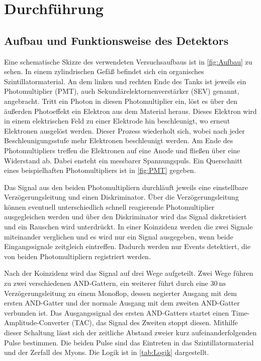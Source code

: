 \section{Durchführung}
\label{sec:Durchführung}
\subsection{Aufbau und Funktionsweise des Detektors}
\label{subsec:Aufbau}
Eine schematische Skizze des verwendeten Versuchsaufbaus ist in \autoref{fig:Aufbau} zu sehen. In einem zylindrischen Gefäß befindet sich ein organisches
Szintillatormaterial. An dem linken und rechten Ende des Tanks ist jeweils ein Photomultiplier (PMT), auch Sekundärelektornenverstärker (SEV) genannt, angebracht.
Tritt ein Photon in diesen Photomultiplier ein, löst es über den äußerden Photoeffekt ein Elektron aus dem Material heraus. Dieses Elektron wird in einem elektrischen Feld 
zu einer Elektrode hin beschleunigt, wo erneut Elektronen ausgelöst werden. Dieser Prozess wiederholt sich, wobei nach jeder Beschleunigungsstufe mehr Elektronen beschleunigt werden.
Am Ende des Photomultipliers treffen die Elektronen auf eine Anode und fließen über eine Widerstand ab. Dabei ensteht ein messbarer Spannungspuls. Ein Querschnitt eines beispielhaften
Photomultipliers ist in \autoref{fig:PMT} gegeben.

Das Signal aus den beiden Photomultipliern durchläuft jeweils eine einstellbare Verzögerungsleitung und einen Diskriminator. Über die Verzögerungsleitung können eventuell unterschiedlich
schnell reagierende Photomultiplier ausgegleichen werden und über den Diskriminator wird das Signal diskretisiert und ein Rauschen wird unterdrückt. In einer Koinzidenz werden die zwei 
Signale miteinander verglichen und es wird nur ein Signal ausgegeben, wenn beide Eingangssignale zeitgleich eintreffen. Dadurch werden nur Events detektiert, die von beiden
Photomultipliern registriert werden.

Nach der Koinzidenz wird das Signal auf drei Wege aufgeteilt. Zwei Wege führen zu zwei verschiedenen AND-Gattern, ein weiterer führt durch eine $\qty{30}{\nano\second}$ Verzögerungsleitung 
zu einem Monoflop, dessen negierter Ausgang mit dem ersten AND-Gatter und der normale Ausgang mit dem zweiten AND-Gatter verbunden ist. Das Ausgangssignal des ersten AND-Gatters startet 
einen Time-Amplitude-Converter (TAC), das Signal des Zweiten stoppt diesen. Mithilfe dieser Schaltung lässt sich der zeitliche Abstand zweier kurz aufeinanderfolgenden Pulse bestimmen.
Die beiden Pulse sind das Eintreten in das Szintillatormaterial und der Zerfall des Myons. Die Logik ist in \autoref{tab:Logik} dargestellt.

